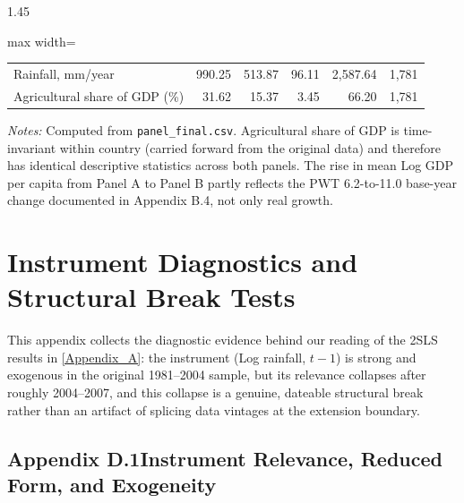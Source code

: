 \documentclass[12pt]{article}
\begin{document}
\begin{bibunit}[jpe]
\begin{spacing}{1.45}
\begin{table}[H]
\begin{adjustbox}{max width=\textwidth}
\begin{threeparttable}
\begin{tabular}{lrrrrr}
Rainfall, mm/year               & 990.25  & 513.87 & 96.11   & 2{,}587.64 & 1{,}781 \\
Agricultural share of GDP (\%) & 31.62   & 15.37 & 3.45     & 66.20  & 1{,}781 \\
\bottomrule
\end{tabular}
\begin{tablenotes}[flushleft]
\footnotesize
\item \textit{Notes:} Computed from \texttt{panel\_final.csv}. Agricultural share of GDP is time-invariant within country (carried forward from the original data) and therefore has identical descriptive statistics across both panels. The rise in mean Log GDP per capita from Panel A to Panel B partly reflects the PWT 6.2-to-11.0 base-year change documented in Appendix B.4, not only real growth.
\end{tablenotes}
\end{threeparttable}
\end{adjustbox}
\end{table}

\section{Instrument Diagnostics and Structural Break Tests\label{Appendix_D}}

This appendix collects the diagnostic evidence behind our reading of the 2SLS results in \ref{Appendix_A}: the instrument (Log rainfall, $t-1$) is strong and exogenous in the original 1981--2004 sample, but its relevance collapses after roughly 2004--2007, and this collapse is a genuine, dateable structural break rather than an artifact of splicing data vintages at the extension boundary.

\subsection*{Appendix D.1\quad Instrument Relevance, Reduced Form, and Exogeneity}


\end{spacing}
\end{bibunit}
\end{document}
